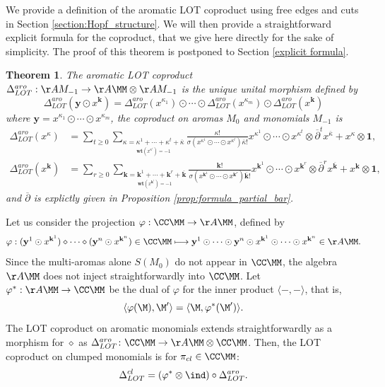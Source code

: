 \documentclass[a4paper,11pt]{article}
\newtheorem{theorem}{Theorem}[section]
\newcommand{\moda}[1]{\textcolor{blue}{#1}\index {#1}}
\begin{document}
We provide a definition of the aromatic LOT coproduct using free edges and cuts in Section \ref{section:Hopf_structure}.
We will then provide a straightforward explicit formula for the coproduct, that we give here directly for the sake of simplicity. The proof of this theorem is postponed to Section \ref{explicit formula}.
\begin{theorem} \label{arobck1}
The aromatic LOT coproduct $\Delta_{LOT}^{aro}: \AA M_{-1} \rightarrow \AA\MM\otimes \AA M_{-1}$ is the unique unital morphism defined by
\begin{equation}\label{coproduct}
\Delta_{LOT}^{aro}(\mathbf y\odot x^{\mathbf k})  = \Delta_{LOT}^{aro}(x^{\kappa_1})\odot \cdots\odot \Delta_{LOT}^{aro}(x^{\kappa_m})\odot\Delta_{LOT}^{aro}(x^{\mathbf k})
\end{equation}
where $\mathbf y=x^{\kappa_1}\odot\cdots\odot x^{\kappa_m}$, the coproduct on aromas $M_0$ and monomials $M_{-1}$ is
\begin{align*}
\Delta_{LOT}^{aro}(x^\kappa) & = \sum_{t\geq 0}\sum_{\underset{\mathbf {wt}(x^{\kappa^i})=-1}{\kappa=\kappa^1 + \cdots + \kappa^t + \overline{\kappa}}} \frac{\kappa!}{\sigma(x^{\kappa^1}\odot \cdots\odot x^{\kappa^t})\overline{\kappa}!} x^{\kappa^1}\odot \cdots\odot  x^{\kappa^t}\otimes \overline{\partial}^t x^{\overline{\kappa}} + x^{\kappa}\otimes \mathbf 1,\\
\Delta_{LOT}^{aro}(x^{\mathbf k})& =   \sum_{r\geq 0} \sum_{\underset{\mathbf {wt}(x^{\mathbf k^i})=-1}{\mathbf k = \mathbf k^1 + \cdots + \mathbf k^r + \overline{\mathbf k}}} \frac{\mathbf k!}{\sigma(x^{\mathbf k^1}\odot \cdots \odot  x^{\mathbf k^r})\overline{\mathbf k}!}x^{\mathbf k^1}\odot \cdots\odot  x^{\mathbf k^r}\otimes \overline{\partial}^r x^{\overline{\mathbf k}} + x^{\mathbf k}\otimes \mathbf 1,    
\end{align*}
and $\overline{\partial}$ is explictly given in Proposition \ref{prop:formula_partial_bar}.
\end{theorem}




Let us consider the projection $\varphi: \CC\MM\rightarrow \AA\MM$, defined by
\[\varphi: (\mathbf y^1\odot x^{\mathbf k^1})\diamond\cdots\diamond (\mathbf y^n\odot x^{\mathbf k^n})\in \CC\MM \longmapsto \mathbf y^1\odot \cdots \odot \mathbf y^n \odot x^{\mathbf k^1}\odot \cdots \odot x^{\mathbf k^n}\in \AA\MM.\]
Since the multi-aromas alone $S(M_0)$ do not appear in $\CC\MM$, the algebra $\AA\MM$ does not inject straightforwardly into $\CC\MM$.
Let $\varphi^*: \AA\MM\rightarrow \CC\MM$ be the dual of $\varphi$ for the inner product $\langle -,-\rangle$, that is,
\[\langle \varphi(\M), \M'\rangle = \langle \M, \varphi^* (\M') \rangle.\]
The LOT coproduct on aromatic monomials extends straightforwardly as a morphism for $\diamond$ as
$\Delta_{LOT}^{aro}\colon \CC\MM\rightarrow \AA\MM\otimes \CC\MM$.
Then, the LOT coproduct on clumped monomials is for $\pi_{cl}\in \CC\MM$:
\[\Delta_{LOT}^{cl}=(\varphi^* \otimes \ind)\circ \Delta_{LOT}^{aro}.\]
\end{document}
